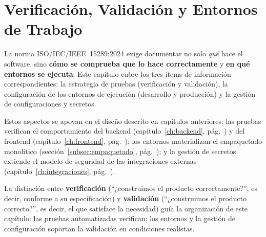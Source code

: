 \chapter{Verificación, Validación y Entornos de Trabajo}
\label{ch:vyv}

La norma ISO/IEC/IEEE~15289:2024 exige documentar no solo \textit{qué} hace el software,
sino \textbf{cómo se comprueba que lo hace correctamente} y \textbf{en qué entornos se
ejecuta}. Este capítulo cubre los tres ítems de información correspondientes: la estrategia
de pruebas (verificación y validación), la configuración de los entornos de ejecución
(desarrollo y producción) y la gestión de configuraciones y secretos.

Estos aspectos se apoyan en el diseño descrito en capítulos anteriores: las pruebas
verifican el comportamiento del backend (capítulo~\ref{ch:backend},
pág.~\pageref{ch:backend}) y del frontend (capítulo~\ref{ch:frontend},
pág.~\pageref{ch:frontend}); los entornos materializan el empaquetado monolítico
(sección~\ref{subsec:empaquetado}, pág.~\pageref{subsec:empaquetado}); y la gestión de
secretos extiende el modelo de seguridad de las integraciones externas
(capítulo~\ref{ch:integraciones}, pág.~\pageref{ch:integraciones}).

\begin{NotaTecnica}
La distinción entre \textbf{verificación} (``¿construimos el producto correctamente?'',
es decir, conforme a su especificación) y \textbf{validación} (``¿construimos el producto
correcto?'', es decir, el que satisface la necesidad) guía la organización de este
capítulo: las pruebas automatizadas verifican; los entornos y la gestión de configuración
soportan la validación en condiciones realistas.
\end{NotaTecnica}

